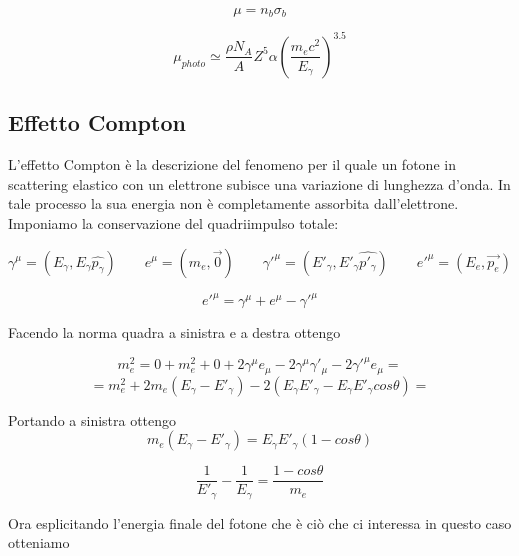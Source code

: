 \documentclass [a4paper, twoside] {book}
\begin{document}
\begin{equation}
\mu=n_{b}\sigma_{b} 
\end{equation}

\begin{equation}
\mu_{photo}\simeq\frac{\rho N_{A}}{A}Z^5\alpha(\frac{m_{e}c^2}{E_{\gamma}})^{3.5}
\end{equation}

\subsection{Effetto Compton}

L'effetto Compton è la descrizione del fenomeno per il quale un fotone in scattering elastico con un elettrone subisce una variazione di lunghezza d'onda. In tale processo la sua energia non è completamente assorbita dall'elettrone. Imponiamo la conservazione del quadriimpulso totale:

\begin{equation}
\gamma^{\mu}=(E_{\gamma},E_{\gamma}\hat{p_{\gamma}})\qquad e^{\mu}=(m_e,\vec{0}) \qquad \gamma'^{\mu}=(E'_{\gamma},E'_{\gamma}\hat{p'_{\gamma}}) \qquad e'^{\mu}=(E_e,\vec{p_e})
\end{equation}

\begin{equation}
e'^{\mu}=\gamma^{\mu}+e^{\mu}-\gamma'^{\mu}
\end{equation}

Facendo la norma quadra a sinistra e a destra ottengo

\begin{equation}
m_e^2=0+m_e^2+0+2\gamma^{\mu}e_{\mu}-2\gamma^{\mu}\gamma'_{\mu}-2\gamma'^{\mu}e_{\mu}=
\end{equation}
\begin{equation}
=m_e^2+2m_e(E_{\gamma}-E'_{\gamma})-2(E_{\gamma}E'_{\gamma}-E_{\gamma}E'_{\gamma}cos\theta)=
\end{equation}

Portando a sinistra ottengo
\begin{equation}
m_e(E_{\gamma}-E'_{\gamma})=E_{\gamma}E'_{\gamma}(1-cos\theta)
\end{equation}

\begin{equation}
\frac{1}{E'_{\gamma}}-\frac{1}{E_{\gamma}}=\frac{1-cos\theta}{m_e}
\end{equation}

Ora esplicitando l'energia finale del fotone che è ciò che ci interessa in questo caso otteniamo
\end{document}
